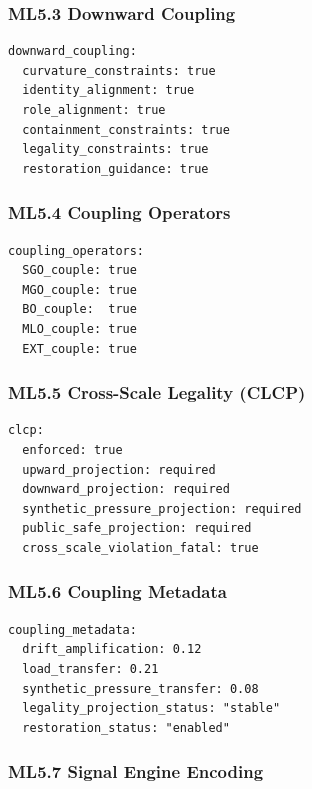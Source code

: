 \subsubsection*{ML5.3 Downward Coupling}

\begin{verbatim}
downward_coupling:
  curvature_constraints: true
  identity_alignment: true
  role_alignment: true
  containment_constraints: true
  legality_constraints: true
  restoration_guidance: true
\end{verbatim}
\subsubsection*{ML5.4 Coupling Operators}

\begin{verbatim}
coupling_operators:
  SGO_couple: true
  MGO_couple: true
  BO_couple:  true
  MLO_couple: true
  EXT_couple: true
\end{verbatim}
\subsubsection*{ML5.5 Cross-Scale Legality (CLCP)}

\begin{verbatim}
clcp:
  enforced: true
  upward_projection: required
  downward_projection: required
  synthetic_pressure_projection: required
  public_safe_projection: required
  cross_scale_violation_fatal: true
\end{verbatim}
\subsubsection*{ML5.6 Coupling Metadata}

\begin{verbatim}
coupling_metadata:
  drift_amplification: 0.12
  load_transfer: 0.21
  synthetic_pressure_transfer: 0.08
  legality_projection_status: "stable"
  restoration_status: "enabled"
\end{verbatim}
\subsubsection*{ML5.7 Signal Engine Encoding}

